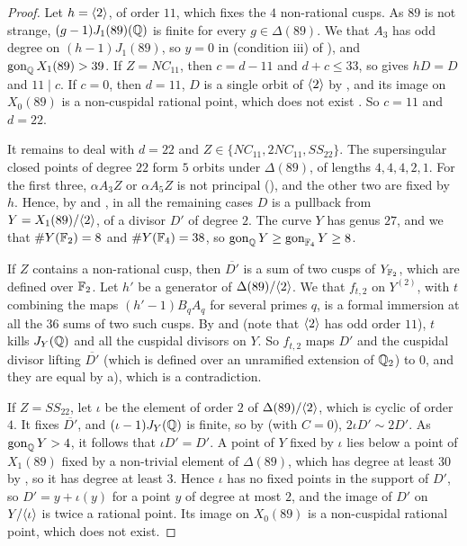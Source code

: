\begin{proof}
Let $h=\langle 2\rangle$, of order $11$, which fixes the $4$ non-rational cusps. As $89$ is not strange, $(g-1)J_1(89)(\mathbb{Q})$ is finite for every $g\in\Delta(89)$. We  that $A_3$ has odd degree on $(h-1)J_1(89)$, so $y=0$ in  (condition iii) of ), and $\operatorname{gon}_{\mathbb{Q}} X_1(89)>39$. If $Z=NC_{11}$, then $c=d-11$ and $d+c\leq 33$, so  gives $hD=D$ and $11\mid c$. If $c=0$, then $d=11$, $D$ is a single orbit of $\langle 2\rangle$ by , and its image on $X_0(89)$ is a non-cuspidal rational point, which does not exist \cite[Theorem 1]{mazur78}. So $c=11$ and $d=22$.

It remains to deal with $d=22$ and $Z\in\{NC_{11},2NC_{11},SS_{22}\}$. The supersingular closed points of degree $22$ form $5$ orbits under $\Delta(89)$, of lengths $4,4,4,2,1$. For the first three, $\alpha A_3Z$ or $\alpha A_5Z$ is not principal (), and the other two are fixed by $h$. Hence, by  and , in all the remaining cases $D$ is a pullback from $Y=X_1(89)/\langle 2\rangle$, of a divisor $D'$ of degree $2$. The curve $Y$ has genus $27$, and we  that $\#Y(\mathbb{F}_2)=8$ and $\#Y(\mathbb{F}_4)=38$, so $\operatorname{gon}_{\mathbb{Q}} Y\geq\operatorname{gon}_{\mathbb{F}_4}Y\geq8$.

If $Z$ contains a non-rational cusp, then $\overline{D'}$ is a sum of two cusps of $Y_{\mathbb{F}_2}$, which are defined over $\mathbb{F}_2$. Let $h'$ be a generator of $\Delta(89)/\langle 2\rangle$. We  that $f_{t,2}$ on $Y^{(2)}$, with $t$ combining the maps $(h'-1)B_qA_q$ for several primes $q$, is a formal immersion at all the $36$ sums of two such cusps. By  and  (note that $\langle 2\rangle$ has odd order $11$), $t$ kills $J_Y(\mathbb{Q})$ and all the cuspidal divisors on $Y$. So $f_{t,2}$ maps $D'$ and the cuspidal divisor lifting $\overline{D'}$ (which is defined over an unramified extension of $\mathbb{Q}_2$) to $0$, and they are equal by  a), which is a contradiction.

If $Z=SS_{22}$, let $\iota$ be the element of order $2$ of $\Delta(89)/\langle 2\rangle$, which is cyclic of order $4$. It fixes $\overline{D'}$, and $(\iota-1)J_Y(\mathbb{Q})$ is finite, so by  (with $C=0$), $2\iota D'\sim 2D'$. As $\operatorname{gon}_{\mathbb{Q}} Y>4$, it follows that $\iota D'=D'$. A point of $Y$ fixed by $\iota$ lies below a point of $X_1(89)$ fixed by a non-trivial element of $\Delta(89)$, which has degree at least $30$ by , so it has degree at least $3$. Hence $\iota$ has no fixed points in the support of $D'$, so $D'=y+\iota(y)$ for a point $y$ of degree at most $2$, and the image of $D'$ on $Y/\langle \iota\rangle$ is twice a rational point. Its image on $X_0(89)$ is a non-cuspidal rational point, which does not exist.
\end{proof}

